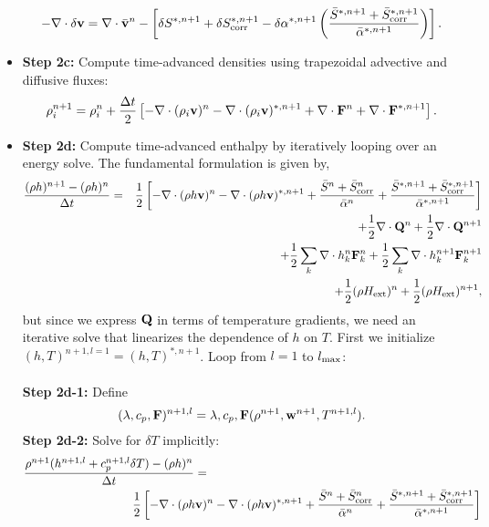 \documentclass[final]{siamltex}
\def\Fb {{\bf F}}
\def\Qb {{\bf Q}}
\def\vb {{\bf v}}
\def\wb {{\bf w}}
\def\Hext {H_{\rm ext}}
\def\half   {\frac{1}{2}}
\begin{document}
\begin{itemize}
\begin{eqnarray}
\end{eqnarray}
\begin{equation}
-\nabla\cdot\delta\vb = \nabla\cdot\bar{\vb}^n - \left[\delta S^{*,n+1} + \delta S_{\rm corr}^{*,n+1} - \delta\alpha^{*,n+1}\left(\frac{\bar{S}^{*,n+1} + \bar{S}_{\rm corr}^{*,n+1}}{\bar{\alpha}^{*,n+1}}\right)\right].
\end{equation}
\item {\bf Step 2c:} Compute time-advanced densities using trapezoidal advective and diffusive fluxes:
\begin{equation}
\rho_i^{n+1} = \rho_i^n + \frac{\Delta t}{2}\left[-\nabla\cdot(\rho_i\vb)^n -\nabla\cdot(\rho_i\vb)^{*,n+1} + \nabla\cdot\Fb^n + \nabla\cdot\Fb^{*,n+1}\right].
\end{equation}
\item {\bf Step 2d:} Compute time-advanced enthalpy by iteratively looping over an energy solve.
The fundamental formulation is given by,
\begin{eqnarray}
\frac{(\rho h)^{n+1} - (\rho h)^n}{\Delta t} &=& \half\left[-\nabla\cdot(\rho h\vb)^n -\nabla\cdot(\rho h\vb)^{*,n+1} + \frac{\bar{S}^n + \bar{S}_{\rm corr}^n}{\bar{\alpha}^n} + \frac{\bar{S}^{*,n+1}+ \bar{S}_{\rm corr}^{*,n+1}}{\bar{\alpha}^{*,n+1}}\right]\nonumber\\
&&+ \half\nabla\cdot\Qb^n + \half\nabla\cdot\Qb^{n+1}\nonumber\\
&&+ \half\sum_k\nabla\cdot h_k^n\Fb_k^n + \half\sum_k\nabla\cdot h_k^{n+1}\Fb_k^{n+1}\nonumber\\
&&+ \half(\rho\Hext)^n + \half(\rho\Hext)^{n+1},
\end{eqnarray}
but since we express $\Qb$ in terms of temperature gradients, we need an iterative solve that linearizes
the dependence of $h$ on $T$.  First we initialize $(h,T)^{n+1,l=1} = (h,T)^{*,n+1}$.
Loop from $l=1$ to $l_{\rm max}$:\\ \\
{\bf Step 2d-1:} Define
\begin{equation}
(\lambda,c_p,\Fb)^{n+1,l} = \lambda,c_p,\Fb(\rho^{n+1},\wb^{n+1},T^{n+1,l}).
\end{equation}
{\bf Step 2d-2:} Solve for $\delta T$ implicitly:
\begin{eqnarray}
\frac{\rho^{n+1}(h^{n+1,l} + c_p^{n+1,l}\delta T) - (\rho h)^n}{\Delta t} &=& \nonumber\\
&&\hspace{-1in}\half\left[-\nabla\cdot(\rho h\vb)^n - \nabla\cdot(\rho h\vb)^{*,n+1} + \frac{\bar{S}^n + \bar{S}_{\rm corr}^n}{\bar{\alpha}^n} + \frac{\bar{S}^{*,n+1}+ \bar{S}_{\rm corr}^{*,n+1}}{\bar{\alpha}^{*,n+1}}\right] \nonumber\\

\end{eqnarray}
\end{itemize}
\end{document}
